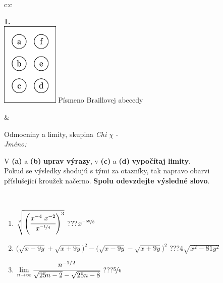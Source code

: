 \documentclass[10pt]{report}
\begin{document}
\begin{tabular}{c:c}
\begin{minipage}[c][104.5mm][t]{0.5\linewidth}
\begin{center}
\begin{minipage}{0.20\linewidth}
\begin{center}
{\Huge\bfseries 1.} \\[2mm]
\includegraphics[height=40mm]{../images/braille.png}
{\small Písmeno Braillovej abecedy}
\end{center}
\end{minipage}
\end{center}
\end{minipage}
&
\begin{minipage}[c][104.5mm][t]{0.5\linewidth}
\begin{center}
\vspace{7mm}
{\huge Odmocniny a limity, skupina \textit{Chi $\chi$} -}\\[5mm]
\textit{Jméno:}\phantom{xxxxxxxxxxxxxxxxxxxxxxxxxxxxxxxxxxxxxxxxxxxxxxxxxxxxxxxxxxxxxxxxx}\\[5mm]
\begin{minipage}{0.95\linewidth}
\begin{center}
V \textbf{(a)} a \textbf{(b)} \textbf{uprav výrazy}, v \textbf{(c)} a \textbf{(d)} \textbf{vypočítaj limity}.\\Pokud se výsledky shodujú s tými za otazníky, tak napravo obarvi\\příslušející kroužek načerno. \textbf{Spolu odevzdejte výsledné slovo}.
\end{center}
\end{minipage}
\\[1mm]
\begin{minipage}{0.79\linewidth}
\begin{center}
\begin{varwidth}{\linewidth}
\begin{enumerate}
\small
\item $\sqrt[2]{\left(\cfrac{x^{-4}\;x^{-2}}{x^{\nicefrac{-1}{4}}}\right)^{3}}$\quad \dotfill\; ???\;\dotfill \quad $x^{\nicefrac{-69}{8}}$
\item {\footnotesize{\scriptsize$\big(\sqrt{x-9y}+\sqrt{x+9y}\big)^2-\big(\sqrt{x-9y}-\sqrt{x+9y}\big)^2$}\quad \dotfill\; ???\;\dotfill \quad $4\sqrt{x^2-81y^2}$}
\item $\lim\limits_{n\to\infty}\cfrac{n^{-1/2}}{\sqrt{25n-2}-\sqrt{25n-8}}$\quad \dotfill\; ???\;\dotfill \quad $\nicefrac{5}{6}$

\end{enumerate}
\end{varwidth}
\end{center}
\end{minipage}
\end{center}
\end{minipage}
\end{tabular}
\end{document}
